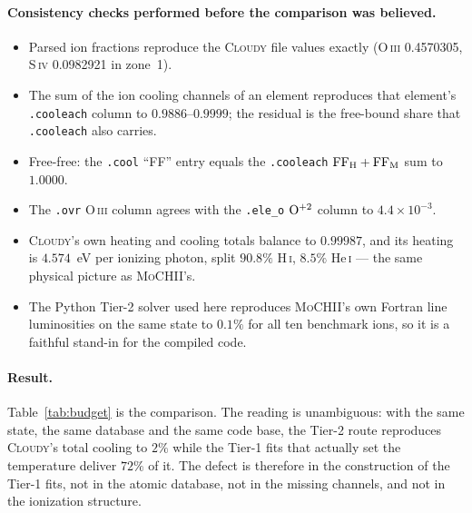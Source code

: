 \documentclass[english,a4paper]{my_memo}
\newcommand{\code}[1]{\texttt{#1}}
\newcommand{\MoCHII}{\textsc{MoCHII}}
\newcommand{\Cloudy}{\textsc{Cloudy}}
\newcommand{\HI}{H\,\textsc{i}}
\newcommand{\HeI}{He\,\textsc{i}}
\newcommand{\OIII}{O\,\textsc{iii}}
\newcommand{\SIV}{S\,\textsc{iv}}
\begin{document}
\paragraph{Consistency checks performed before the comparison was believed.}
\begin{itemize}\itemsep2pt
\item Parsed ion fractions reproduce the \Cloudy{} file values exactly
      (\OIII{} 0.4570305, \SIV{} 0.0982921 in zone~1).
\item The sum of the ion cooling channels of an element reproduces that
      element's \code{.cooleach} column to $0.9886$--$0.9999$; the residual is
      the free-bound share that \code{.cooleach} also carries.
\item Free-free: the \code{.cool} ``FF'' entry equals the \code{.cooleach}
      ${\rm FF_H} + {\rm FF_M}$ sum to $1.0000$.
\item The \code{.ovr} \OIII{} column agrees with the \code{.ele\_o} $\rm O^{+2}$
      column to $4.4\times10^{-3}$.
\item \Cloudy{}'s own heating and cooling totals balance to $0.99987$, and its
      heating is $4.574$~eV per ionizing photon, split $90.8\%$ \HI{},
      $8.5\%$ \HeI{} --- the same physical picture as \MoCHII{}'s.
\item The Python Tier-2 solver used here reproduces \MoCHII{}'s own Fortran
      line luminosities on the same state to $0.1\%$ for all ten benchmark
      ions, so it is a faithful stand-in for the compiled code.
\end{itemize}

\paragraph{Result.}  Table~\ref{tab:budget} is the comparison.  The reading is
unambiguous: with the same state, the same database and the same code base,
the Tier-2 route reproduces \Cloudy{}'s total cooling to $2\%$ while the
Tier-1 fits that actually set the temperature deliver $72\%$ of it.  The
defect is therefore in the construction of the Tier-1 fits, not in the atomic
database, not in the missing channels, and not in the ionization structure.
\end{document}
